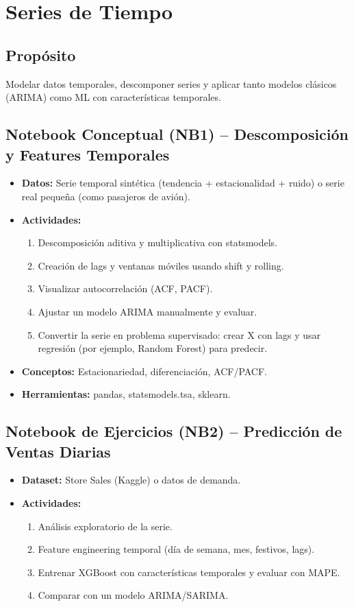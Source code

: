 \documentclass[12pt,a4paper]{article}
\begin{document}
\section{Series de Tiempo}
\subsection*{Propósito}
Modelar datos temporales, descomponer series y aplicar tanto modelos clásicos (ARIMA) como ML con características temporales.

\subsection*{Notebook Conceptual (NB1) – Descomposición y Features Temporales}
\begin{itemize}
    \item \textbf{Datos:} Serie temporal sintética (tendencia + estacionalidad + ruido) o serie real pequeña (como pasajeros de avión).
    \item \textbf{Actividades:}
    \begin{enumerate}
        \item Descomposición aditiva y multiplicativa con statsmodels.
        \item Creación de lags y ventanas móviles usando shift y rolling.
        \item Visualizar autocorrelación (ACF, PACF).
        \item Ajustar un modelo ARIMA manualmente y evaluar.
        \item Convertir la serie en problema supervisado: crear X con lags y usar regresión (por ejemplo, Random Forest) para predecir.
    \end{enumerate}
    \item \textbf{Conceptos:} Estacionariedad, diferenciación, ACF/PACF.
    \item \textbf{Herramientas:} pandas, statsmodels.tsa, sklearn.
\end{itemize}

\subsection*{Notebook de Ejercicios (NB2) – Predicción de Ventas Diarias}
\begin{itemize}
    \item \textbf{Dataset:} Store Sales (Kaggle) o datos de demanda.
    \item \textbf{Actividades:}
    \begin{enumerate}
        \item Análisis exploratorio de la serie.
        \item Feature engineering temporal (día de semana, mes, festivos, lags).
        \item Entrenar XGBoost con características temporales y evaluar con MAPE.
        \item Comparar con un modelo ARIMA/SARIMA.
    \end{enumerate}
\end{itemize}
\end{document}
